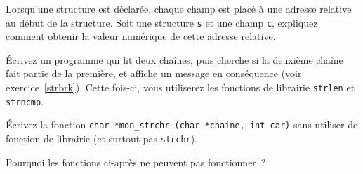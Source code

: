 \question

Lorsqu'une structure est déclarée, chaque champ est placé à une adresse
relative au début de la structure.  Soit une structure {\tt s} et une
champ {\tt c}, expliquez comment obtenir la valeur numérique de cette
adresse relative.


\question

Écrivez un programme qui lit deux chaînes, puis cherche si la deuxième
chaîne fait partie de la première, et affiche un message en conséquence
(voir exercice~\ref {strbrk}).  Cette fois-ci, vous utiliserez les
fonctions de librairie {\tt strlen} et {\tt strncmp}.


\question

Écrivez la fonction \verb:char *mon_strchr (char *chaine, int car):
sans utiliser de fonction de librairie (et surtout pas {\tt strchr}).


\question

Pourquoi les fonctions ci-après ne peuvent pas fonctionner~?
%

